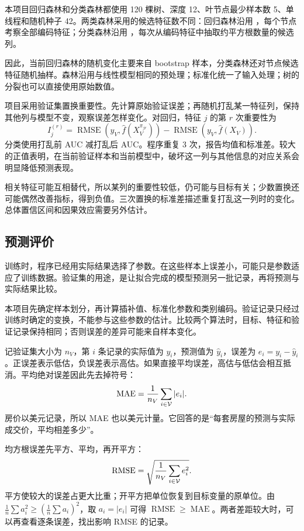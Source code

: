 本项目回归森林和分类森林都使用 120 棵树、深度 12、叶节点最少样本数 5、单线程和随机种子 42。两类森林采用的候选特征数不同：回归森林沿用 ，每个节点考察全部编码特征\citep{sklearnforestreg}；分类森林沿用 ，每次从编码特征中抽取约平方根数量的候选列\citep{sklearnforestclass}。

因此，当前回归森林的随机变化主要来自 bootstrap 样本，分类森林还对节点候选特征随机抽样。森林沿用与线性模型相同的预处理；标准化统一了输入处理；树的分裂也可以直接使用原始数值。

项目采用验证集置换重要性。先计算原始验证误差；再随机打乱某一特征列，保持其他列与模型不变，观察误差怎样变化。对回归，特征 $j$ 的第 $r$ 次重要性为
\begin{equation}
I_j^{(r)}=\operatorname{RMSE}(y_V,\hat f(X_V^{\pi_{jr}}))
-\operatorname{RMSE}(y_V,\hat f(X_V)).
\end{equation}
分类使用打乱前 AUC 减打乱后 AUC。程序重复 3 次，报告均值和标准差。较大的正值表明，在当前验证样本和当前模型中，破坏这一列与其他信息的对应关系会明显降低预测表现。

相关特征可能互相替代，所以某列的重要性较低，仍可能与目标有关；少数置换还可能偶然改善指标，得到负值。三次置换的标准差描述重复打乱这一列时的变化。总体置信区间和因果效应需要另外估计。


\subsection{预测评价}
训练时，程序已经用实际结果选择了参数。在这些样本上误差小，可能只是参数适应了训练数据。验证集的用途，是让拟合完成的模型预测另一批记录，再将预测与实际结果比较。

本项目先确定样本划分，再计算插补值、标准化参数和类别编码。验证记录只经过训练时确定的变换，不能参与这些参数的估计。比较两个算法时，目标、特征和验证记录保持相同；否则误差的差异可能来自样本变化。

记验证集大小为 $n_V$，第 $i$ 条记录的实际值为 $y_i$，预测值为 $\hat y_i$，误差为 $e_i=y_i-\hat y_i$。正误差表示低估，负误差表示高估。如果直接平均误差，高估与低估会相互抵消。平均绝对误差因此先去掉符号：
\begin{equation}
\operatorname{MAE}=\frac1{n_V}\sum_{i\in\mathcal{V}}|e_i|.
\end{equation}
房价以美元记录，所以 MAE 也以美元计量。它回答的是“每套房屋的预测与实际成交价，平均相差多少”。

均方根误差先平方、平均，再开平方：
\begin{equation}\label{app:eq:rmse}
\operatorname{RMSE}=\sqrt{\frac1{n_V}\sum_{i\in\mathcal{V}}e_i^2}.
\end{equation}
平方使较大的误差占更大比重；开平方把单位恢复到目标变量的原单位。由 $\frac1n\sum a_i^2\geq(\frac1n\sum a_i)^2$，取 $a_i=|e_i|$ 可得 $\operatorname{RMSE}\geq\operatorname{MAE}$。两者差距较大时，可以再查看逐条误差，找出影响 RMSE 的记录。


